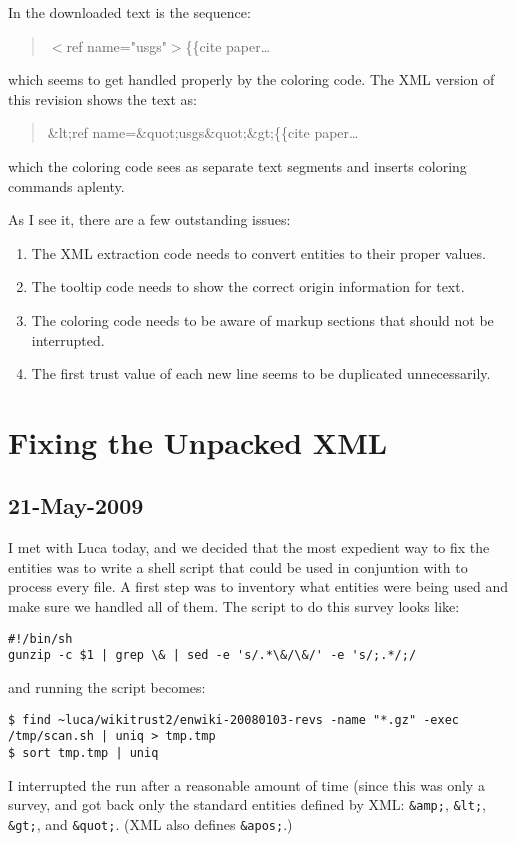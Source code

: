 In the downloaded text is the sequence:
\begin{quote}
$<$ref name="usgs"$>$\{\{cite paper\ldots
\end{quote}
which seems to get handled properly by the coloring code.
The XML version of this revision shows the text as:
\begin{quote}
\&lt;ref name=\&quot;usgs\&quot;\&gt;\{\{cite paper\ldots
\end{quote}
which the coloring code sees as separate text segments
and inserts coloring commands aplenty.


As I see it, there are a few outstanding issues:
\begin{enumerate}
\item The XML extraction code needs to convert entities to their
    proper values.
\item The tooltip code needs to show the correct origin information
    for text.
\item The coloring code needs to be aware of markup sections
    that should not be interrupted.
\item The first trust value of each new line seems to be
    duplicated unnecessarily.
\end{enumerate}


\section{Fixing the Unpacked XML}

\subsection{21-May-2009}

I met with Luca today, and we decided that the most expedient
way to fix the entities was to write a shell script that could
be used in conjuntion with  to process every file.
A first step was to inventory what entities were being used and
make sure we handled all of them.
The script to do this survey looks like:
\begin{verbatim}
#!/bin/sh
gunzip -c $1 | grep \& | sed -e 's/.*\&/\&/' -e 's/;.*/;/
\end{verbatim}
and running the script becomes:
\begin{verbatim}
$ find ~luca/wikitrust2/enwiki-20080103-revs -name "*.gz" -exec /tmp/scan.sh | uniq > tmp.tmp
$ sort tmp.tmp | uniq
\end{verbatim}
I interrupted the run after a reasonable amount of time (since this
was only a survey, and got back only the standard entities defined by
XML: \texttt{\&amp;}, \texttt{\&lt;}, \texttt{\&gt;}, and \texttt{\&quot;}.
(XML also defines \texttt{\&apos;}.)

